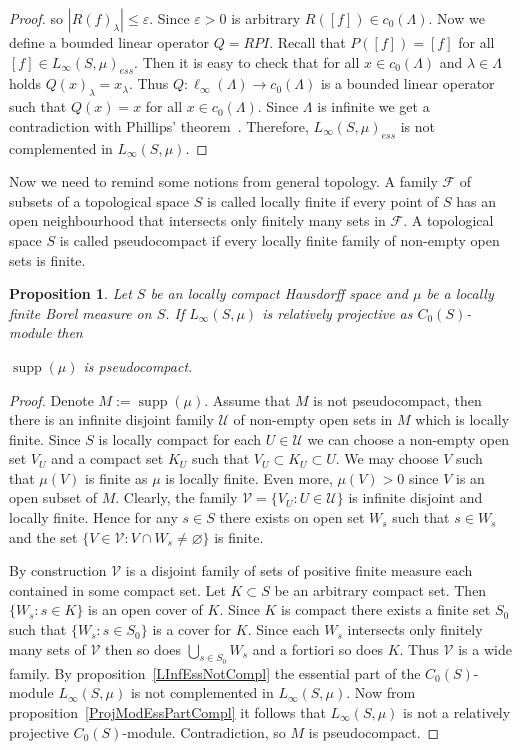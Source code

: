 \documentclass[12pt]{article}
\newtheorem{proposition}[theorem]{Proposition}
\begin{document}
\begin{proof}
    so $|{R(f)}_\lambda|\leq\varepsilon$. Since $\varepsilon>0$ is arbitrary
    $R([f])\in c_0(\Lambda)$. Now we define a bounded linear operator $Q=RPI$.
    Recall that $P([f])=[f]$ for all $[f]\in {L_\infty(S,\mu)}_{ess}$. Then it
    is easy to check that for all $x\in c_0(\Lambda)$ and $\lambda\in\Lambda$
    holds ${Q(x)}_\lambda=x_\lambda$. Thus $Q:\ell_\infty(\Lambda)\to
        c_0(\Lambda)$ is a bounded linear operator such that $Q(x)=x$ for all $x\in
        c_0(\Lambda)$. Since $\Lambda$ is infinite we get a contradiction with
    Phillips' theorem~\cite{PhilOnLinTran}. Therefore, ${L_\infty(S,\mu)}_{ess}$
    is not complemented in $L_\infty(S,\mu)$.
\end{proof}

Now we need to remind some notions from general topology. A family $\mathcal{F}$
of subsets of a topological space $S$ is called locally finite if every point of
$S$ has an open neighbourhood that intersects only finitely many sets in
$\mathcal{F}$. A topological space $S$ is called pseudocompact if every locally
finite family of non-empty open sets is finite.

\begin{proposition}\label{LInfRelProjSuppCond} Let $S$ be an locally compact
    Hausdorff space and $\mu$ be a locally finite Borel measure on $S$. If
    $L_\infty(S,\mu)$ is relatively projective as $C_0(S)$-module then

    $\operatorname{supp}(\mu)$ is pseudocompact.
\end{proposition}
\begin{proof} Denote $M:=\operatorname{supp}(\mu)$. Assume that $M$ is not
    pseudocompact, then there is an infinite disjoint family $\mathcal{U}$ of
    non-empty open sets in $M$ which is locally finite. Since $S$ is locally
    compact for each $U\in\mathcal{U}$ we can choose a non-empty open set $V_U$
    and a compact set $K_U$ such that $V_U\subset K_U\subset  U$. We may choose
    $V$ such that $\mu(V)$ is finite as $\mu$ is locally finite. Even more,
    $\mu(V)>0$ since $V$ is an open subset of $M$. Clearly, the family
    $\mathcal{V}=\{V_U:U\in\mathcal{U}\}$ is infinite disjoint and locally
    finite. Hence for any $s\in S$ there exists on open set $W_s$ such that
    $s\in W_s$ and the set $\{V\in\mathcal{V}: V\cap W_s\neq\varnothing \}$ is
    finite.

    By construction $\mathcal{V}$ is a disjoint family of sets of positive
    finite measure each contained in some compact set. Let $K\subset S$ be an
    arbitrary compact set. Then $\{W_s:s\in K\}$ is an open cover of $K$. Since
    $K$ is compact there exists a finite set $S_0$ such that $\{W_s:s\in S_0\}$
    is a cover for $K$. Since each $W_s$ intersects only finitely many sets of
    $\mathcal{V}$ then so does $\bigcup_{s\in S_0}W_s$ and a fortiori so does
    $K$. Thus $\mathcal{V}$ is a wide family. By
    proposition~\ref{LInfEssNotCompl} the essential part of the $C_0(S)$-module
    $L_\infty(S,\mu)$ is not complemented in $L_\infty(S,\mu)$. Now from
    proposition~\ref{ProjModEssPartCompl} it follows that $L_\infty(S,\mu)$ is
    not a relatively projective $C_0(S)$-module. Contradiction, so $M$ is
    pseudocompact.
\end{proof}
\end{document}
